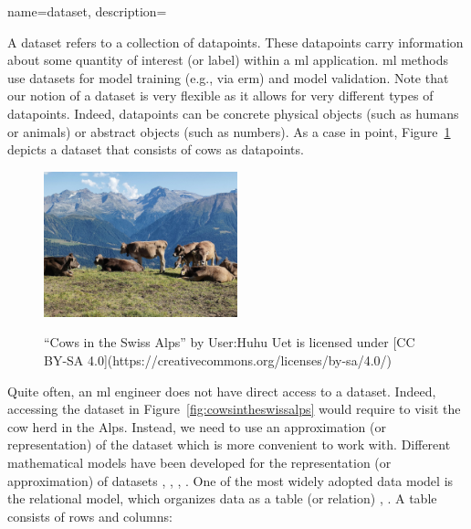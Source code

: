 {{
{name={dataset},
	description={A dataset refers to a collection of \gls{datapoint}s. These 
		\gls{datapoint}s carry information about some quantity of interest (or \gls{label}) within 
		a \gls{ml} application. \gls{ml} methods use datasets for \gls{model} training (e.g., via \gls{erm})
		and \gls{model} \gls{validation}. Note that our notion of a dataset is very flexible as 
		it allows for very different types of \gls{datapoint}s. Indeed, \gls{datapoint}s can be concrete 
		physical objects (such as humans or animals) or abstract objects (such as numbers). 
		As a case in point, Figure\ \ref{fig_cows_dataset} depicts a dataset that consists of cows as 
		\gls{datapoint}s. 
		\begin{figure}[H]
				\begin{center}
		\label{fig:cowsintheswissalps}
		\includegraphics[width=0.5\textwidth]{assets/Cows_in_the_Swiss_Alps}
		  \end{center}
		\caption{\label{fig_cows_dataset}“Cows in the Swiss Alps” by User:Huhu Uet is licensed under [CC BY-SA 4.0](https://creativecommons.org/licenses/by-sa/4.0/)}
	  \end{figure}
       Quite often, an \gls{ml} engineer does not have direct access to a dataset. Indeed, accessing the 
       dataset in Figure\ \ref{fig:cowsintheswissalps} would require to visit the cow herd in the Alps. Instead, 
       we need to use an approximation (or representation) of the dataset which is more convenient 
       to work with. Different mathematical models have been developed for the representation (or approximation) 
       of datasets \cite{silberschatz2019database}, \cite{abiteboul1995foundations}, \cite{hoberman2009data}, \cite{ramakrishnan2002database}. 
       One of the most widely adopted data \gls{model} is the relational model, which organizes \gls{data} 
       as a table (or relation) \cite{codd1970relational}, \cite{silberschatz2019database}.
		A table consists of rows and columns:
		\begin{itemize} 

\end{itemize}}}}}
